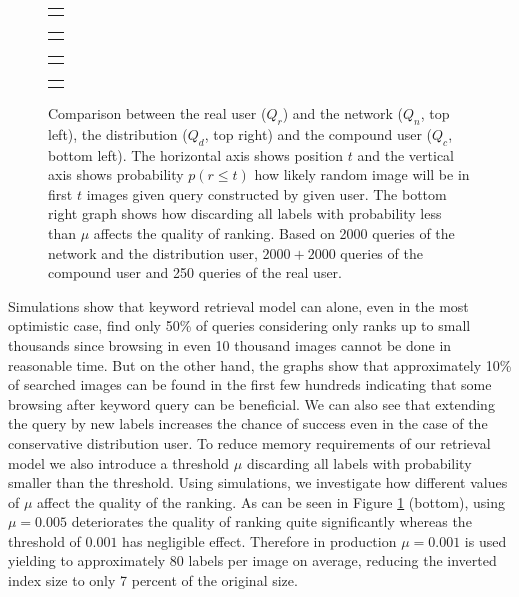 \begin{figure}[ht]
	\centering
	
	\begin{tabular}{@{}c@{}}
		\subfloat{
			
		}
	\end{tabular}
	\begin{tabular}{@{}c@{}}
		\subfloat{
			
		}
	\end{tabular}
	\begin{tabular}{@{}c@{}}
	\subfloat{
		
	}
	\end{tabular}
	\begin{tabular}{@{}c@{}}
		\subfloat{
			
		}
	\end{tabular}

	
	\caption[Comparison between simulated and real user]{Comparison between the real user ($Q_r$) and the network ($Q_n$, top left), the distribution ($Q_d$, top right) and the compound user ($Q_c$, bottom left). The horizontal axis shows position $t$ and the vertical axis shows probability $p(r\leq t)$ how likely random image will be in first $t$ images given query constructed by given user. The bottom right graph shows how discarding all labels with probability less than $\mu$ affects the quality of ranking. Based on 2000 queries of the network and the distribution user, $2000+2000$ queries of the compound user and 250 queries of the real user.}
	\label{fig:simulation_keyword}
\end{figure}
Simulations show that keyword retrieval model can alone, even in the most optimistic case, find only 50\% of queries considering only ranks up to small thousands since browsing in even 10 thousand images cannot be done in reasonable time. But on the other hand, the graphs show that approximately 10\% of searched images can be found in the first few hundreds indicating that some browsing after keyword query can be beneficial. We can also see that extending the query by new labels increases the chance of success even in the case of the conservative distribution user.
To reduce memory requirements of our retrieval model we also introduce a threshold $\mu$ discarding all labels with probability smaller than the threshold. Using simulations, we investigate how different values of $\mu$ affect the quality of the ranking. As can be seen in Figure \ref{fig:simulation_keyword} (bottom), using $\mu=0.005$ deteriorates the quality of ranking quite significantly whereas the threshold of $0.001$ has negligible effect. Therefore in production $\mu = 0.001$ is used yielding to approximately 80 labels per image on average, reducing the inverted index size to only 7 percent of the original size.

